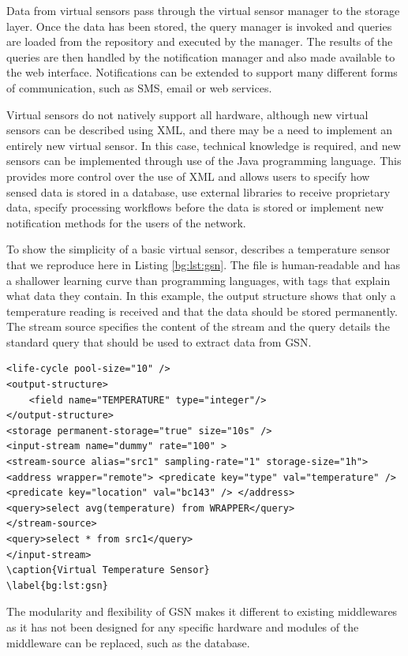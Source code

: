 Data from virtual sensors pass through the virtual sensor manager to the storage layer. Once the data has been stored, the query manager is invoked and queries are loaded from the repository and executed by the manager. The results of the queries are then handled by the notification manager and also made available to the web interface. Notifications can be extended to support many different forms of communication, such as SMS, email or web services.

Virtual sensors do not natively support all hardware, although new virtual sensors can be described using XML, and there may be a need to implement an entirely new virtual sensor. In this case, technical knowledge is required, and new sensors can be implemented through use of the Java programming language. This provides more control over the use of XML and allows users to specify how sensed data is stored in a database, use external libraries to receive proprietary data, specify processing workflows before the data is stored or implement new notification methods for the users of the network.

To show the simplicity of a basic virtual sensor, \cite{Aberer2007} describes a temperature sensor that we reproduce here in Listing \ref{bg:lst:gsn}. The file is human-readable and has a shallower learning curve than programming languages, with tags that explain what data they contain. In this example, the output structure shows that only a temperature reading is received and that the data should be stored permanently. The stream source specifies the content of the stream and the query details the standard query that should be used to extract data from GSN.

\begin{lstlisting}
<life-cycle pool-size="10" />
<output-structure> 
	<field name="TEMPERATURE" type="integer"/> 
</output-structure>
<storage permanent-storage="true" size="10s" /> 
<input-stream name="dummy" rate="100" > 
<stream-source alias="src1" sampling-rate="1" storage-size="1h">
<address wrapper="remote"> <predicate key="type" val="temperature" /> <predicate key="location" val="bc143" /> </address> 
<query>select avg(temperature) from WRAPPER</query>
</stream-source>
<query>select * from src1</query> 
</input-stream>
\caption{Virtual Temperature Sensor}
\label{bg:lst:gsn}
\end{lstlisting}

The modularity and flexibility of GSN makes it different to existing middlewares as it has not been designed for any specific hardware and modules of the middleware can be replaced, such as the database. 

